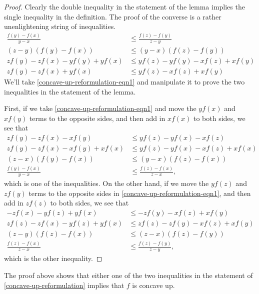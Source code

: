 \begin{proof}
	Clearly the double inequality in the statement of the lemma implies the single inequality in the definition. The proof of the converse is a rather unenlightening string of inequalities. 
	\begin{equation} \label{concave-up-reformulation-eqn1} \begin{aligned} \frac{f(y)-f(x)}{y-x} &\leq \frac{f(z)-f(y)}{z-y} \\
	(z-y)(f(y)-f(x)) &\leq (y-x)(f(z)-f(y)) \\
	zf(y) - zf(x) - yf(y) + yf(x) &\leq yf(z) - yf(y) - xf(z) +xf(y) \\
	zf(y) - zf(x) + yf(x) &\leq yf(z) - xf(z) + xf(y)
	\end{aligned} \end{equation}
	We'll take \cref{concave-up-reformulation-eqn1} and manipulate it to prove the two inequalities in the statement of the lemma. 
	
	First, if we take \cref{concave-up-reformulation-eqn1} and move the $yf(x)$ and $xf(y)$ terms to the opposite sides, and then add in $xf(x)$ to both sides, we see that 
	\[ \begin{aligned} 
	zf(y) - zf(x) - xf(y) &\leq yf(z) - yf(x) - xf(z) \\
	zf(y) - zf(x) - xf(y) + xf(x) &\leq yf(z) - yf(x) - xf(z) + xf(x) \\
	(z-x)(f(y)-f(x)) &\leq (y-x)(f(z)-f(x)) \\
	\frac{f(y)-f(x)}{y-x} &\leq \frac{f(z)-f(x)}{z-x},
	\end{aligned} \]
	which is one of the inequalities. On the other hand, if we move the $yf(z)$ and $zf(y)$ terms to the opposite sides in \cref{concave-up-reformulation-eqn1}, and then add in $zf(z)$ to both sides, we see that 
	\[ \begin{aligned} -zf(x) - yf(z) + yf(x) &\leq -zf(y) - xf(z) + xf(y) \\
	zf(z) -zf(x) - yf(z) + yf(x) &\leq zf(z) -zf(y) - xf(z) + xf(y) \\
	(z-y)(f(z)-f(x)) &\leq (z-x)(f(z)-f(y)) \\
	\frac{f(z)-f(x)}{z-x} &\leq \frac{f(z)-f(y)}{z-y}, \end{aligned} \]
	which is the other inequality. 
\end{proof}

\begin{unimportantremark}
	The proof above shows that either one of the two inequalities in the statement of \cref{concave-up-reformulation} implies that $f$ is concave up. 
\end{unimportantremark}

